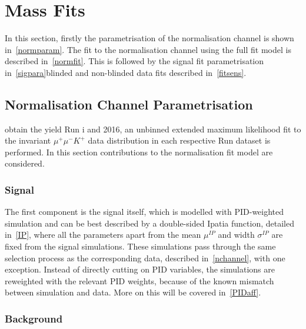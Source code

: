 \newpage
\section{Mass Fits}
In this section, firstly the parametrisation of the normalisation channel is shown in~\autoref{normparam}. The fit to the normalisation channel using the full fit model is described in~\autoref{normfit}. This is followed by the signal fit parametrisation \DIFdelbegin {}\DIFdelend in~\autoref{sigpara}\DIFdelbegin {}\DIFdelend \DIFaddbegin {}\DIFaddend blinded and non-blinded data fits described in~\autoref{fitsens}.

\subsection{Normalisation Channel Parametrisation}
\label{normparam}

\DIFdelbegin {}\DIFdelend \DIFaddbegin {}\DIFaddend obtain the \bjpsimumuk yield \DIFdelbegin {}\DIFdelend \DIFaddbegin {}\DIFaddend Run \Rn{1} and 2016, an unbinned extended maximum likelihood fit to the invariant $\mu^{+} \mu^{-} K^{+}$ data distribution in each respective Run dataset is performed. In this section contributions to the normalisation fit model are considered. 

\subsubsection{Signal}

	The first component is the signal itself, which is modelled with PID-weighted simulation and can be best described by a double-sided Ipatia function, detailed in~\autoref{IP}, where all the parameters apart from the mean $\mu^{IP}$ and width $\sigma^{IP}$ are fixed from the signal simulations. These simulations pass through the same selection process as the corresponding \bjpsimumuk data, described in~\autoref{nchannel}, with one exception. Instead of directly cutting on \gls{PID} variables, the simulations are reweighted with the relevant \gls{PID} weights, because of the known mismatch between simulation and data. More on this will be covered in~\autoref{PIDaff}. 


\subsubsection{\mb{\bjpsimumupi} Background}

